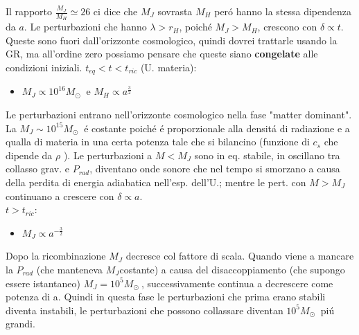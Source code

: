 \documentclass[12pt, a4paper]{article}
\begin{document}
Il rapporto $\frac{M_J}{M_H}\simeq 26$ ci dice che $M_J$ sovrasta $M_H$ per\'{o} hanno la stessa dipendenza da $a$.  Le perturbazioni che hanno $\lambda>r_H$, poich\'{e} $M_J>M_H$, crescono con $\delta\propto t$. Queste sono fuori dall'orizzonte cosmologico, quindi dovrei trattarle usando la GR, ma all'ordine zero possiamo pensare che queste siano \textbf{congelate} alle condizioni iniziali. 
\underline{$t_{eq}<t<t_{ric}$} (U. materia): \\
\begin{itemize}
\item $M_J\propto 10^{16} M_\odot\ $ e $ M_H\propto a^{\frac{3}{2}}$
\end{itemize}
Le perturbazioni entrano nell'orizzonte cosmologico nella fase "matter dominant". La $M_J\sim 10^{15} M_\odot\ $ \'{e} costante poich\'{e} \'{e} proporzionale alla densit\'{a} di radiazione e a qualla di materia in una certa potenza tale che si bilancino (funzione di $c_s$ che dipende da $\rho$ ). Le perturbazioni a $M<M_J$ sono in eq. stabile, in oscillano tra collasso grav. e $P_{rad}$, diventano onde sonore che nel tempo si smorzano a causa della perdita di energia adiabatica nell'esp. dell'U.; mentre le pert. con $M>M_J$ continuano a crescere con $\delta\propto a$.\\
\underline{$t>t_{ric}$}: \\
\begin{itemize}
\item $M_J \propto a^{-\frac{3}{2}}$
\end{itemize}
Dopo la ricombinazione $M_J$ decresce col fattore di scala. Quando viene a mancare la $P_{rad}$ (che manteneva $M_J $costante) a causa del disaccoppiamento (che supongo essere istantaneo) $M_J=10^{5} M_\odot\ $, successivamente continua a decrescere come potenza di a. Quindi in questa fase le perturbazioni che prima erano stabili diventa instabili, le perturbazioni che possono collassare diventan $10^5 M_\odot\ $ pi\'{u} grandi.
\end{document}
